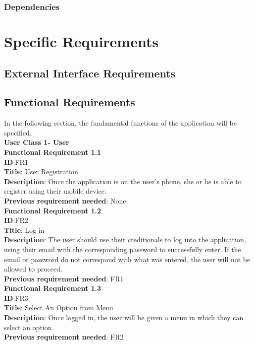 \documentclass[english]{article}
\begin{document}
	
				\begin{large}
				\subsubsection{Dependencies}
				\end{large}
		
		\newpage

	\section{Specific Requirements}
				\subsection{External Interface Requirements}
				\subsection{Functional Requirements}
				In the following section, the fundamental functions of the application will be specified.\\
				\textbf{User Class 1- User}\\
				\textbf{Functional Requirement 1.1}\\
				\textbf{ID}:FR1\\
				\textbf{Title}: User Registration\\
				\textbf{Description}: Once the application is on the user's phone, she or he is able to register using their mobile device.\\
				\textbf{Previous requirement needed}: None\\
				
				\textbf{Functional Requirement 1.2}\\
				\textbf{ID}:FR2\\
				\textbf{Title}: Log in\\
				\textbf{Description}: The user should use their creditionals to log into the application, using their email with the corresponding password to successfully enter. If the email or password do not correspond with what was entered, the user will not be allowed to proceed.\\
				\textbf{Previous requirement needed}: FR1\\
				
				
				\textbf{Functional Requirement 1.3}\\
				\textbf{ID}:FR3\\
				\textbf{Title}: Select An Option from Menu\\
				\textbf{Description}: Once logged in, the user will be given a menu in which they can select an option.\\
				\textbf{Previous requirement needed}: FR2\\
				
\end{document}
